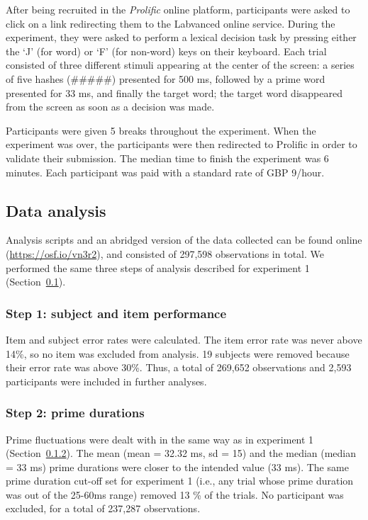 \documentclass[
]{interact}
\begin{document}
After being recruited in the \emph{Prolific} online platform,
participants were asked to click on a link redirecting them to the
Labvanced online service. During the experiment, they were asked to
perform a lexical decision task by pressing either the `J' (for word) or
`F' (for non-word) keys on their keyboard. Each trial consisted of three
different stimuli appearing at the center of the screen: a series of
five hashes (\#\#\#\#\#) presented for 500 ms, followed by a prime word
presented for 33 ms, and finally the target word; the target word
disappeared from the screen as soon as a decision was made.

Participants were given 5 breaks throughout the experiment. When the
experiment was over, the participants were then redirected to Prolific
in order to validate their submission. The median time to finish the
experiment was 6 minutes. Each participant was paid with a standard rate
of GBP 9/hour.

\subsection{Data analysis}\label{sec-exp1-analysis}

Analysis scripts and an abridged version of the data collected can be
found online (\url{https://osf.io/vn3r2}), and consisted of 297,598
observations in total. We performed the same three steps of analysis
described for experiment 1 (Section~\ref{sec-exp1-analysis}).

\subsubsection{Step 1: subject and item
performance}\label{sec-exp1-analysis-performance}

Item and subject error rates were calculated. The item error rate was
never above 14\%, so no item was excluded from analysis. 19 subjects
were removed because their error rate was above 30\%. Thus, a total of
269,652 observations and 2,593 participants were included in further
analyses.

\subsubsection{Step 2: prime
durations}\label{sec-exp1-analysis-primeTime}

Prime fluctuations were dealt with in the same way as in experiment 1
(Section~\ref{sec-exp1-analysis-primeTime}). The mean (mean = 32.32 ms,
sd = 15) and the median (median = 33 ms) prime durations were closer to
the intended value (33 ms). The same prime duration cut-off set for
experiment 1 (i.e., any trial whose prime duration was out of the
25-60ms range) removed 13 \% of the trials. No participant was excluded,
for a total of 237,287 observations.
\end{document}
